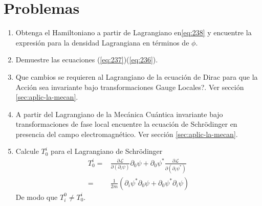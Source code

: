  



\section{Problemas}
\label{sec:problemas-2}
\renewcommand{\labelenumi}{\thechapter.\theenumi} %
\begin{enumerate}
\item Obtenga el Hamiltoniano a partir de Lagrangiano en\eqref{eq:238} y encuentre la expresi\'on para la densidad Lagrangiana en t\'erminos de $\phi$.
\label{item:pch1.0} %
\item Demuestre las ecuaciones (\ref{eq:237})(\ref{eq:236}).
\label{item:pch1.1} %

\item \textquestiondown Que cambios se requieren al Lagrangiano de la ecuaci\'on de Dirac para que la Acci\'on sea invariante bajo transformaciones Gauge Locales?. Ver secci\'on \ref{sec:aplic-la-mecan}.



\label{item:pch1.3} %

\item A partir del Lagrangiano de la Mec\'anica Cu\'antica invariante bajo transformaciones de fase local encuentre la ecuaci\'on de Schr\"odinger en presencia del campo electromagn\'etico. Ver secci\'on \ref{sec:aplic-la-mecan}.
 



\item Calcule $T^i_0$ para el Lagrangiano de Schr\"odinger
  \begin{align}
    T^i_0=&\frac{\partial\mathcal{L}}{\partial(\partial_i \psi)}\partial_0\psi+\partial_0\psi^*\frac{\partial\mathcal{L}}{\partial(\partial_i \psi^*)}\nonumber\\
    =&\frac{1}{2m}\left(\partial_i\psi^*\partial_0\psi+\partial_0\psi^*\partial_i\psi \right)
  \end{align}
De modo que $T^0_i\neq T^i_0$.

\end{enumerate}


\renewcommand{\labelenumi}{\theenumi} %
